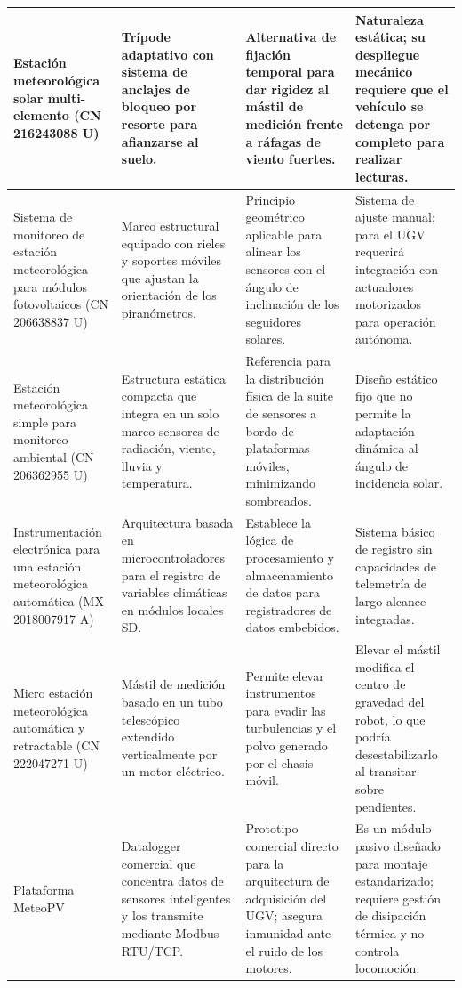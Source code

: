 \documentclass[../../General.tex]{subfiles}
\begin{document}
\begin{center}
\begin{xltabular}{\textwidth}{|p{3.5cm}|>{\raggedright\arraybackslash}X|>{\raggedright\arraybackslash}X|>{\raggedright\arraybackslash}X|}
		Estación meteorológica solar multi-elemento (CN 216243088 U) & Trípode adaptativo con sistema de anclajes de bloqueo por resorte para afianzarse al suelo. & Alternativa de fijación temporal para dar rigidez al mástil de medición frente a ráfagas de viento fuertes. & Naturaleza estática; su despliegue mecánico requiere que el vehículo se detenga por completo para realizar lecturas. \\ \hline
		Sistema de monitoreo de estación meteorológica para módulos fotovoltaicos (CN 206638837 U) & Marco estructural equipado con rieles y soportes móviles que ajustan la orientación de los piranómetros. & Principio geométrico aplicable para alinear los sensores con el ángulo de inclinación de los seguidores solares. & Sistema de ajuste manual; para el UGV requerirá integración con actuadores motorizados para operación autónoma. \\ \hline
		Estación meteorológica simple para monitoreo ambiental (CN 206362955 U) & Estructura estática compacta que integra en un solo marco sensores de radiación, viento, lluvia y temperatura. & Referencia para la distribución física de la suite de sensores a bordo de plataformas móviles, minimizando sombreados. & Diseño estático fijo que no permite la adaptación dinámica al ángulo de incidencia solar. \\ \hline
		Instrumentación electrónica para una estación meteorológica automática (MX 2018007917 A) & Arquitectura basada en microcontroladores para el registro de variables climáticas en módulos locales SD. & Establece la lógica de procesamiento y almacenamiento de datos para registradores de datos embebidos. & Sistema básico de registro sin capacidades de telemetría de largo alcance integradas. \\ \hline
		Micro estación meteorológica automática y retractable (CN 222047271 U) & Mástil de medición basado en un tubo telescópico extendido verticalmente por un motor eléctrico. & Permite elevar instrumentos para evadir las turbulencias y el polvo generado por el chasis móvil. & Elevar el mástil modifica el centro de gravedad del robot, lo que podría desestabilizarlo al transitar sobre pendientes. \\ \hline
		Plataforma MeteoPV & Datalogger comercial que concentra datos de sensores inteligentes y los transmite mediante Modbus RTU/TCP. & Prototipo comercial directo para la arquitectura de adquisición del UGV; asegura inmunidad ante el ruido de los motores. & Es un módulo pasivo diseñado para montaje estandarizado; requiere gestión de disipación térmica y no controla locomoción. \\ \hline
		
	\end{xltabular}
\end{center}
\end{document}
